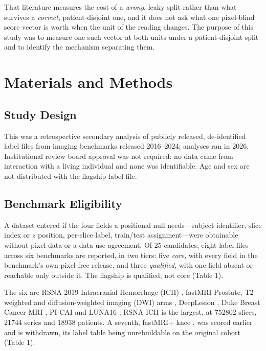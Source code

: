 \documentclass[11pt,letterpaper]{article}
\begin{document}
That literature measures the cost of a \emph{wrong}, leaky split rather than what
survives a \emph{correct}, patient-disjoint one, and it does not ask what one
pixel-blind score vector is worth when the unit of the reading changes. The
purpose of this study was to measure one such vector at both units under a
patient-disjoint split and to identify the mechanism separating them.

\section*{Materials and Methods}

\subsection*{Study Design}

This was a retrospective secondary analysis of publicly released, de-identified
label files from imaging benchmarks released 2016--2024; analyses ran in 2026.
Institutional review board approval was not required: no data came from
interaction with a living individual and none was identifiable. Age and sex are not distributed with the flagship
label file.

\subsection*{Benchmark Eligibility}

A dataset entered if the four fields a positional null needs---subject
identifier, slice index or $z$ position, per-slice label, train/test
assignment---were obtainable without pixel data or a data-use agreement. Of 25
candidates, eight label files across six benchmarks are reported, in two tiers:
five \emph{core}, with every field in the benchmark's own pixel-free release, and
three \emph{qualified}, with one field absent or reachable only outside it. The
flagship is qualified, not core (Table 1).

The six are RSNA 2019 Intracranial Hemorrhage (ICH)
\citep{flanders2020rsnaich}, fastMRI Prostate, T2-weighted and
diffusion-weighted imaging (DWI) arms \citep{tibrewala2023fastmriprostate},
DeepLesion \citep{yan2018deeplesion},
Duke Breast Cancer MRI \citep{saha2021dukebreastmri,saha2018radiogenomics},
PI-CAI \citep{saha2024picai} and LUNA16 \citep{setio2017luna16}; RSNA ICH is the
largest, at \num{752802} slices, \num{21744} series and \num{18938} patients. A seventh, fastMRI+
knee \citep{zhao2022fastmriplus}, was scored earlier and is withdrawn, its label
table being unrebuildable on the original cohort (Table 1).
\end{document}
